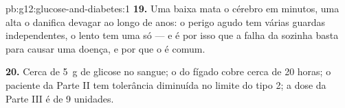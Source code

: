 \begin{solution}{pb:g12:glucose-and-diabetes:1}
\textbf{19.} Uma  baixa mata o cérebro em minutos, uma alta o
danifica devagar ao longo de anos: o perigo agudo tem várias guardas
independentes, o lento tem uma só --- e é por isso que a falha da
 sozinha basta para causar uma doença, e por que o  é
comum.

\textbf{20.} Cerca de \qty{5}{g} de glicose no sangue; o  do
fígado cobre cerca de 20 horas; o paciente da Parte II tem tolerância
diminuída no limite do  tipo 2; a dose da Parte III é de 9
unidades.
\end{solution}
